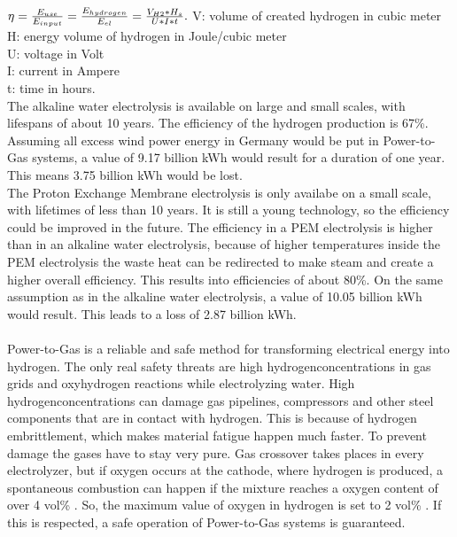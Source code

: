 \documentclass[11pt,a4paper]{article}
\begin{document}
\begin{parcolumns}[colwidths={1=2.5 cm, 2=10 cm, 3=2.5 cm}]{3}
{\begin{math}
\eta = \frac{E_{use}}{E_{input}} = \frac{E_{hydrogen}}{E_{el}} = \frac{V_{H2}* H_{s}}{U*I*t}. \\
\end{math}
V: volume of created hydrogen in cubic meter\\
H: energy volume of hydrogen in Joule/cubic meter\\
U: voltage in Volt\\
I: current in Ampere\\
t: time in hours. 
\\
The alkaline water electrolysis is available on large and small scales, with lifespans of about 10 years. The efficiency of the hydrogen production is 67\%. Assuming all excess wind power energy in Germany would be put in Power-to-Gas systems, a value of 9.17 billion kWh would result for a duration of one year. This means 3.75 billion kWh would be lost. 
\\
The Proton Exchange Membrane electrolysis is only availabe on a small scale, with lifetimes of less than 10 years. It is still a young technology, so the efficiency could be improved in the future. The efficiency in a PEM electrolysis is higher than in an alkaline water electrolysis, because of higher temperatures inside the PEM electrolysis the waste heat can be redirected to make steam and create a higher overall efficiency. This results into efficiencies of about 80\%. On the same assumption as in the alkaline water electrolysis, a value of 10.05 billion kWh would result. This leads to a loss of 2.87 billion kWh. 
\\ \\
Power-to-Gas is a reliable and safe method for transforming electrical energy into hydrogen. The only real safety threats are high hydrogenconcentrations in gas grids and oxyhydrogen reactions while electrolyzing water. High hydrogenconcentrations can damage gas pipelines, compressors and other steel components that are in contact with hydrogen. This is because of hydrogen embrittlement, which makes material fatigue happen much faster. To prevent damage the gases have to stay very pure. Gas crossover takes places in every electrolyzer, but if oxygen occurs at the cathode, where hydrogen is produced, a spontaneous combustion can happen if the mixture reaches a oxygen content of over 4 vol\% . So, the maximum value of oxygen in hydrogen is set to 2 vol\% . If this is respected, a safe operation of Power-to-Gas systems is guaranteed.
\\ \\
}
\end{parcolumns}
\end{document}
